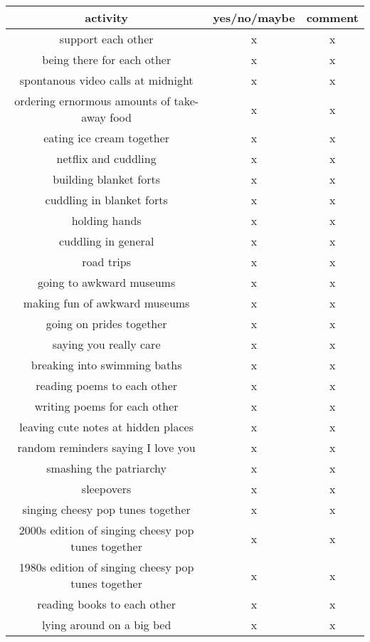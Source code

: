 \documentclass[a4paper]{article}
\begin{document}
\begin{table}[htb]
	\begin{tabular}{@{}ccc@{}}
        \toprule
        activity &  yes/no/maybe &  comment \\
        \midrule
        support each other &  x &  x \\
        being there for each other &  x &  x \\
        spontanous video calls at midnight &  x &  x \\
        ordering ernormous amounts of take-away food &  x &  x \\
        eating ice cream together &  x &  x \\
        netflix and cuddling &  x &  x \\
        building blanket forts &  x &  x \\
        cuddling in blanket forts &  x &  x \\
        holding hands &  x &  x \\
        cuddling in general &  x &  x \\
        road trips &  x &  x \\
        going to awkward museums &  x &  x \\
        making fun of awkward museums &  x &  x \\
        going on prides together &  x &  x \\
        saying you really care &  x &  x \\
        breaking into swimming baths &  x &  x \\
        reading poems to each other &  x &  x \\
        writing poems for each other &  x &  x \\
        leaving cute notes at hidden places &  x &  x \\
        random reminders saying I love you &  x &  x \\
        smashing the patriarchy &  x &  x \\
        sleepovers &  x &  x \\
        singing cheesy pop tunes together &  x &  x \\
        2000s edition of singing cheesy pop tunes together &  x &  x \\
        1980s edition of singing cheesy pop tunes together &  x &  x \\
        reading books to each other &  x &  x \\
        lying around on a big bed &  x &  x \\

\end{tabular}
\end{table}
\end{document}
